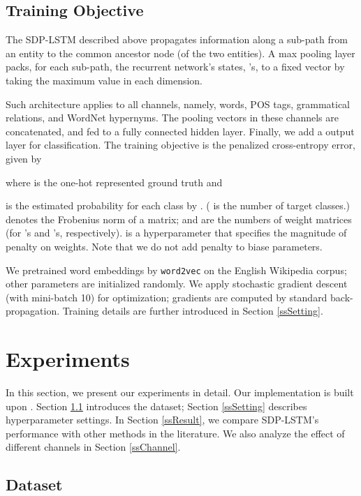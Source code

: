 \documentclass[11pt,a4paper]{article}
\begin{document}
\subsection{Training Objective}\label{ssObjective}

The SDP-LSTM described above
propagates information along a sub-path from an entity
to the common ancestor node (of the two entities).
A max pooling layer packs, for each sub-path, the recurrent network's states, 's,
to a fixed vector by taking the maximum value in each dimension.

Such architecture applies to all channels, namely, words, POS tags, grammatical relations,
and WordNet hypernyms. The pooling vectors in these channels
are concatenated, and fed to a fully connected hidden layer.
Finally, we add a  output layer for classification.
The training objective is the penalized cross-entropy error, given by

where  is the one-hot represented ground truth and

is the estimated probability for each class by .
( is the number of target classes.)
 denotes the Frobenius norm of a matrix;  and 
are the numbers of weight matrices (for 's and 's, respectively).
 is a hyperparameter that specifies the magnitude of penalty on weights.
Note that we do not add  penalty to biase parameters.

We pretrained word embeddings by \verb|word2vec| \cite{Word2vce}
on the English Wikipedia corpus;
other parameters are initialized randomly.
We apply stochastic gradient descent (with mini-batch 10)
for optimization; gradients are computed by standard back-propagation.
Training details are further introduced in Section \ref{ssSetting}.

\section{Experiments}\label{sExperiment}



In this section, we present our experiments in detail.
Our implementation is built upon .
Section \ref{ssData} introduces the dataset;
Section \ref{ssSetting} describes hyperparameter settings.
In Section \ref{ssResult}, we compare
SDP-LSTM's performance with other methods in the literature.
We also analyze the effect of different channels in Section \ref{ssChannel}.


\subsection{Dataset}\label{ssData}
\end{document}
